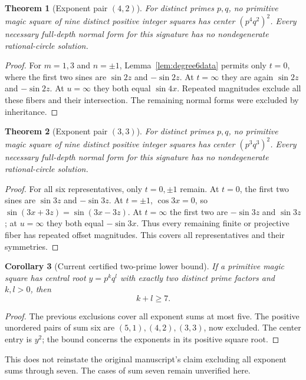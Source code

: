 \documentclass[11pt]{article}
\newtheorem{theorem}{Theorem}[section]
\newtheorem{corollary}[theorem]{Corollary}
\theoremstyle{definition}\newtheorem{definition}[theorem]{Definition}
\theoremstyle{remark}\newtheorem{remark}[theorem]{Remark}
\begin{document}
\begin{theorem}[Exponent pair $(4,2)$]\label{thm:42}
For distinct primes $p,q$, no primitive magic square of nine distinct positive integer squares has center $(p^4q^2)^2$. Every necessary full-depth normal form for this signature has no nondegenerate rational-circle solution.
\end{theorem}
\begin{proof}
For $m=1,3$ and $n=\pm1$, Lemma~\ref{lem:degree6data} permits only $t=0$, where the first two sines are $\sin2z$ and $-\sin2z$. At $t=\infty$ they are again $\sin2z$ and $-\sin2z$. At $u=\infty$ they both equal $\sin4x$. Repeated magnitudes exclude all these fibers and their intersection. The remaining normal forms were excluded by inheritance.
\end{proof}

\begin{theorem}[Exponent pair $(3,3)$]\label{thm:33}
For distinct primes $p,q$, no primitive magic square of nine distinct positive integer squares has center $(p^3q^3)^2$. Every necessary full-depth normal form for this signature has no nondegenerate rational-circle solution.
\end{theorem}
\begin{proof}
For all six representatives, only $t=0,\pm1$ remain. At $t=0$, the first two sines are $\sin3z$ and $-\sin3z$. At $t=\pm1$, $\cos3x=0$, so $\sin(3x+3z)=\sin(3x-3z)$. At $t=\infty$ the first two are $-\sin3z$ and $\sin3z$; at $u=\infty$ they both equal $-\sin3x$. Thus every remaining finite or projective fiber has repeated offset magnitudes. This covers all representatives and their symmetries.
\end{proof}

\begin{corollary}[Current certified two-prime lower bound]\label{cor:bound}
If a primitive magic square has central root $y=p^kq^l$ with exactly two distinct prime factors and $k,l>0$, then
\[
\boxed{k+l\ge7.}
\]
\end{corollary}
\begin{proof}
The previous exclusions cover all exponent sums at most five. The positive unordered pairs of sum six are $(5,1),(4,2),(3,3)$, now excluded. The center entry is $y^2$; the bound concerns the exponents in its positive square root.
\end{proof}
This does not reinstate the original manuscript's claim excluding all exponent sums through seven. The cases of sum seven remain unverified here.
\end{document}
